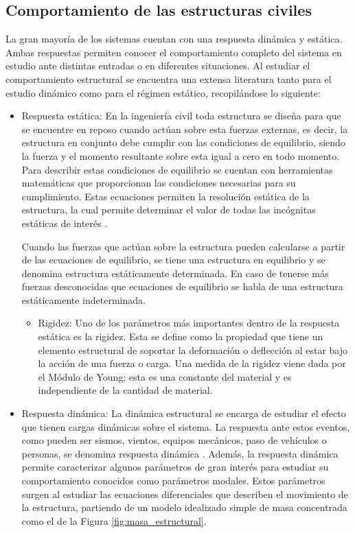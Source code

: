 \subsection{Comportamiento de las estructuras civiles}
\label{sec:comportamiento_estructuras}

La gran mayoría de los sistemas cuentan con una respuesta dinámica y estática. Ambas respuestas permiten conocer el comportamiento completo del sistema en estudio ante distintas entradas o en diferentes situaciones. Al estudiar el comportamiento estructural se encuentra una extensa literatura tanto para el estudio dinámico como para el régimen estático, recopilándose lo siguiente:

\begin{itemize}
    \item{Respuesta estática}: En la ingeniería civil toda estructura se diseña para que se encuentre en reposo cuando actúan sobre esta fuerzas externas, es decir, la estructura en conjunto debe cumplir con las condiciones de equilibrio, siendo la fuerza y el momento resultante sobre esta igual a cero en todo momento. Para describir estas condiciones de equilibrio se cuentan con herramientas matemáticas que proporcionan las condiciones necesarias para su cumplimiento. Estas ecuaciones permiten la resolución estática de la estructura, la cual permite determinar el valor de todas las incógnitas estáticas de interés \citep{basset2014analisis}.
    
    \indent Cuando las fuerzas que actúan sobre la estructura pueden calcularse a partir de las ecuaciones de equilibrio, se tiene una estructura en equilibrio y se denomina estructura estáticamente determinada. En caso de tenerse más fuerzas desconocidas que ecuaciones de equilibrio se habla de una estructura estáticamente indeterminada.

        \begin{itemize}
            \item Rigidez: Uno de los parámetros más importantes dentro de la respuesta estática es la rigidez. Esta se define como la propiedad que tiene un elemento estructural de soportar la deformación o deflección al estar bajo la acción de una fuerza o carga. Una medida de la rigidez viene dada por el Módulo de Young; esta es una constante del material y es independiente de la cantidad de material.
        \end{itemize}

    \item{Respuesta dinámica}: La dinámica estructural se encarga de estudiar el efecto que tienen cargas dinámicas sobre el sistema. La respuesta ante estos eventos, como pueden ser sismos, vientos, equipos mecánicos, paso de vehículos o personas, se denomina respuesta dinámica \citep{hurtado2000}. Además, la respuesta dinámica permite caracterizar algunos parámetros de gran interés para estudiar su comportamiento conocidos como parámetros modales. Estos parámetros surgen al estudiar las ecuaciones diferenciales que describen el movimiento de la estructura, partiendo de un modelo idealizado simple de masa concentrada como el de la Figura \ref{fig:masa_estructural}.
    

\end{itemize}
